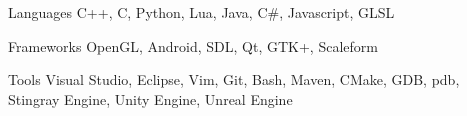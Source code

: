 


\begin{cvskills}


\cvskill
{Languages} %
{C++, C, Python, Lua, Java, C\#, Javascript, GLSL } %

\cvskill
{Frameworks}
{OpenGL, Android, SDL, Qt, GTK+, Scaleform}

\cvskill
{Tools}
{Visual Studio, Eclipse, Vim, Git, Bash, Maven, CMake, GDB, pdb, Stingray Engine, Unity Engine, Unreal Engine}



\end{cvskills}
